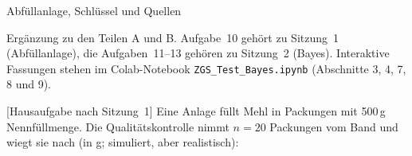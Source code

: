 \begin{uebungsblattc}{Abfüllanlage, Schlüssel und Quellen}
\setcounter{wuzaufgabe}{9}%
\noindent{\small \wuzpersonname: \rule{55mm}{0.3pt}\hfill \wuzdatumname: \rule{30mm}{0.3pt}}\par\medskip
\noindent Ergänzung zu den Teilen A und B. Aufgabe~10 gehört zu
Sitzung~1 (Abfüllanlage), die Aufgaben~11--13 gehören zu Sitzung~2
(Bayes). Interaktive Fassungen stehen im Colab-Notebook
\texttt{ZGS\_Test\_Bayes.ipynb} (Abschnitte 3, 4, 7, 8 und 9).

[Hausaufgabe nach Sitzung~1]
Eine Anlage füllt Mehl in Packungen mit 500\,g Nennfüllmenge. Die
Qualitätskontrolle nimmt $n=20$ Packungen vom Band und wiegt sie nach
(in g; simuliert, aber realistisch):


\end{uebungsblattc}
